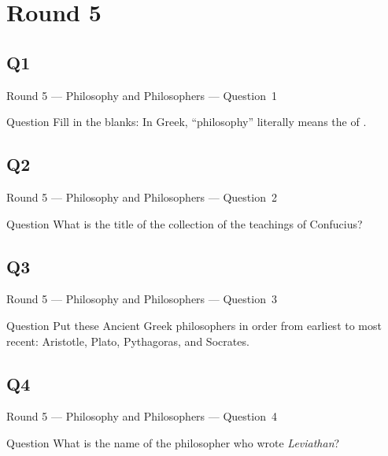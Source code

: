 \documentclass[11pt]{beamer}
\begin{document}
\section{Round 5}
\subsection*{Q1}
\begin{frame}[t]{Round 5 --- Philosophy and Philosophers --- \mbox{Question 1}}
\vspace{-0.5em}
\begin{block}{Question}
Fill in the blanks: In Greek, ``philosophy'' literally means the \textunderscore{}\textunderscore{}\textunderscore{}\textunderscore{}\textunderscore{} of \textunderscore{}\textunderscore{}\textunderscore{}\textunderscore{}\textunderscore{}.
\end{block}
\end{frame}
\subsection*{Q2}
\begin{frame}[t]{Round 5 --- Philosophy and Philosophers --- \mbox{Question 2}}
\vspace{-0.5em}
\begin{block}{Question}
What is the title of the collection of the teachings of Confucius?
\end{block}
\end{frame}
\subsection*{Q3}
\begin{frame}[t]{Round 5 --- Philosophy and Philosophers --- \mbox{Question 3}}
\vspace{-0.5em}
\begin{block}{Question}
Put these Ancient Greek philosophers in order from earliest to most recent: Aristotle, Plato, Pythagoras, and Socrates.
\end{block}
\end{frame}
\subsection*{Q4}
\begin{frame}[t]{Round 5 --- Philosophy and Philosophers --- \mbox{Question 4}}
\vspace{-0.5em}
\begin{block}{Question}
What is the name of the  philosopher who wrote \emph{Leviathan}?
\end{block}
\end{frame}
\end{document}
